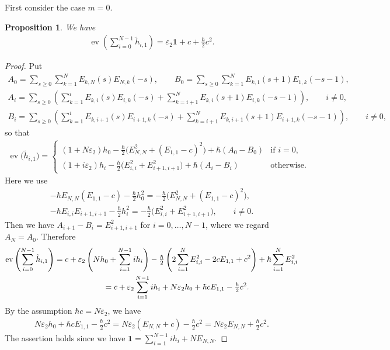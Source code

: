\documentclass[pdftex]{sigma}
\newtheorem{prop}[thm]{Proposition}
\theoremstyle{definition}
\numberwithin{equation}{section}
\DeclareMathOperator{\ev}{ev}
\newcommand{\ve}{\varepsilon}
\newcommand{\bfid}{\mathbf{1}}
\begin{document}
First consider the case $m=0$.
\begin{prop}\label{prop:zero-mode} We have
\begin{gather*} \ev \left( \sum_{i=0}^{N-1} \tilde{h}_{i,1} \right)= \ve_2 \bfid + c + \tfrac{\hbar}{2} c^2.
\end{gather*}
\end{prop}
\begin{proof}
Put
\begin{gather*}
A_0 = \sum_{s \geq 0} \sum_{k=1}^N E_{k,N}(s)E_{N,k}(-s),\qquad
B_0 = \sum_{s \geq 0} \sum_{k=1}^N E_{k,1}(s+1)E_{1,k}(-s-1),\\
A_i = \sum_{s \geq 0} \left( \sum_{k=1}^i E_{k,i}(s)E_{i,k}(-s) + \sum_{k=i+1}^N E_{k,i}(s+1)E_{i,k}(-s-1) \right), \qquad i \neq 0,\\
B_i = \sum_{s \geq 0} \left( \sum_{k=1}^i E_{k,i+1}(s)E_{i+1,k}(-s) + \sum_{k=i+1}^N E_{k,i+1}(s+1)E_{i+1,k}(-s-1) \right), \qquad i \neq 0,
\end{gather*}
so that
\begin{gather*}
\ev\big(\tilde{h}_{i,1}\big) = \begin{cases}
(1+ N \varepsilon_2) h_{0} - \tfrac{\hbar}{2} \big(E_{N,N}^2 + (E_{1,1}-c)^2\big) + \hbar(A_0-B_0)& \text{if $i=0$},\\
(1+ i \varepsilon_2) h_{i} - \tfrac{\hbar}{2} \big(E_{i,i}^2 + E_{i+1,i+1}^2\big) + \hbar(A_i-B_i)& \text{otherwise}.
\end{cases}
\end{gather*}
Here we use
\begin{gather*}
-\hbar E_{N,N}(E_{1,1}-c) - \tfrac{\hbar}{2} h_0^2 = - \tfrac{\hbar}{2} \big(E_{N,N}^2 + (E_{1,1}-c)^2\big),\\
-\hbar E_{i,i} E_{i+1,i+1} - \tfrac{\hbar}{2} h_i^2 = - \tfrac{\hbar}{2} \big(E_{i,i}^2 + E_{i+1,i+1}^2\big), \qquad i \neq 0.
\end{gather*}
Then we have $A_{i+1}-B_{i}=E_{i+1,i+1}^2$ for $i=0,\ldots,N-1$, where we regard $A_N=A_0$.
Therefore
\begin{gather*}
\ev \left( \sum_{i=0}^{N-1} \tilde{h}_{i,1} \right)= c + \ve_2 \left(N h_0 + \sum_{i=1}^{N-1} i h_i\right) -\tfrac{\hbar}{2}\left( 2\sum_{i=1}^N E_{i,i}^2 - 2cE_{1,1} + c^2\right) + \hbar \sum_{i=1}^N E_{i,i}^2 \\
\hphantom{\ev \left( \sum_{i=0}^{N-1} \tilde{h}_{i,1} \right)}{} = c + \ve_2 \sum_{i=1}^{N-1} i h_i + N \ve_2 h_0 + \hbar c E_{1,1} - \tfrac{\hbar}{2}c^2.
\end{gather*}
By the assumption $\hbar c = N\ve_2$, we have
\begin{gather*}
N \ve_2 h_0 + \hbar c E_{1,1} - \tfrac{\hbar}{2}c^2 = N \ve_2 (E_{N,N} + c) - \tfrac{\hbar}{2}c^2 = N \ve_2 E_{N,N} + \tfrac{\hbar}{2}c^2.
\end{gather*}
The assertion holds since we have $\bfid = \sum\limits_{i=1}^{N-1} i h_i + NE_{N,N}$.
\end{proof}
\end{document}
